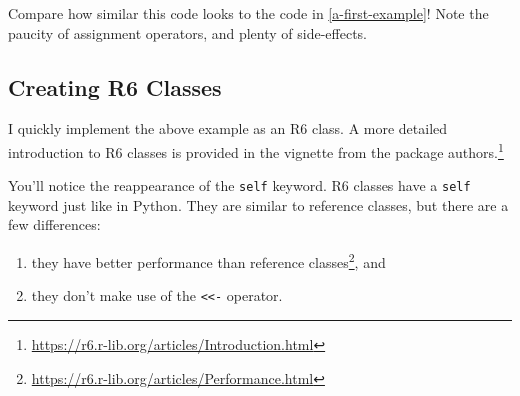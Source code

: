 \documentclass[
  12pt,
]{krantz}
\providecommand{\tightlist}{%
  \setlength{\itemsep}{0pt}\setlength{\parskip}{0pt}}
\renewcommand{\href}[2]{#2\footnote{\url{#1}}}
\begin{document}
Compare how similar this code looks to the code in \ref{a-first-example}! Note the paucity of assignment operators, and plenty of side-effects.

\hypertarget{creating-r6-classes}{%
\subsection{Creating R6 Classes}\label{creating-r6-classes}}

I quickly implement the above example as an R6 class. A more detailed introduction to R6 classes is provided in \href{https://r6.r-lib.org/articles/Introduction.html}{the vignette from the package authors.}

You'll notice the reappearance of the \texttt{self} keyword. R6 classes have a \texttt{self} keyword just like in Python. They are similar to reference classes, but there are a few differences:

\begin{enumerate}
\def\labelenumi{\arabic{enumi}.}
\tightlist
\item
  they have \href{https://r6.r-lib.org/articles/Performance.html}{better performance than reference classes}, and
\item
  they don't make use of the \texttt{\textless{}\textless{}-} operator.
\end{enumerate}
\end{document}
